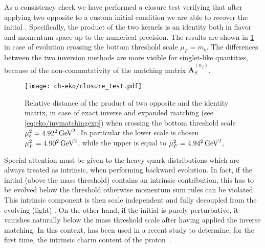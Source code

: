 As a consistency check we have performed a closure test verifying that after
applying two opposite \ekos{} to a custom initial condition
we are able to recover the initial \pdf{}. Specifically, the product of the
two kernels is an identity both in flavor and momentum space up to
the numerical precision. The results are shown in \cref{fig:closure_test} in case of \nnlo{} evolution
crossing the bottom threshold scale $\mu_{F}=m_{b}$. The differences between
the two inversion methods are more visible for singlet-like quantities,
because of the non-commutativity of the matching matrix $\tilde{\mathbf{A}}_{S}^{(n_f)}$.  

\begin{figure}
    \begin{center}
    \texttt{[image: ch-eko/closure\_test.pdf]}
    \end{center}
    \caption{Relative distance of the product of two opposite \nnlo{} \ekos{}
        and the identity matrix, in case of exact inverse and expanded
        matching (see \cref{eq:eko/invmatchingexp}) when crossing the bottom
        threshold scale $\mu_{b}^2=\SI[parse-numbers=false]{4.92^2}{\GeV^2}$. In particular the lower scale is chosen $\muF^2=\SI[parse-numbers=false]{4.90^2}{\GeV^2}$, 
        while the upper is equal to $\muF^2=\SI[parse-numbers=false]{4.94^2}{\GeV^2}$, 
        \label{fig:closure_test}
    }
\end{figure}

Special attention must be given to the heavy quark distributions which are
always treated as intrinsic, when performing backward evolution.
In fact, if the initial \pdf{} (above the mass threshold) contains an intrinsic contribution, this has to be evolved
below the threshold otherwise momentum sum rules can be violated.
This intrinsic component is then scale independent and fully decoupled
from the evolving (light) \pdfs.
On the other hand, if the initial \pdf{} is purely perturbative, it vanishes
naturally below the mass threshold scale after having applied the
inverse matching.
In this context, \eko{} has been used in a recent study to determine, for the first time,
the intrinsic charm content of the proton~\cite{Ball:2022qks}.
